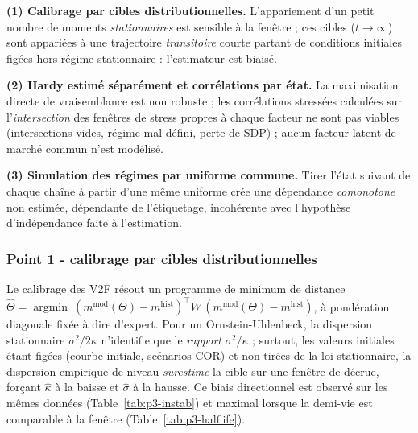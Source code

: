 \documentclass[11pt,a4paper]{article}
\begin{document}
\begin{insightbox}
\textbf{(1) Calibrage par cibles distributionnelles.} L'appariement d'un petit nombre de moments \emph{stationnaires} est sensible à la fenêtre ; ces cibles ($t\to\infty$) sont appariées à une trajectoire \emph{transitoire} courte partant de conditions initiales figées hors régime stationnaire : l'estimateur est biaisé.

\textbf{(2) Hardy estimé séparément et corrélations par état.} La maximisation directe de vraisemblance est non robuste ; les corrélations stressées calculées sur l'\emph{intersection} des fenêtres de stress propres à chaque facteur ne sont pas viables (intersections vides, régime mal défini, perte de SDP) ; aucun facteur latent de marché commun n'est modélisé.

\textbf{(3) Simulation des régimes par uniforme commune.} Tirer l'état suivant de chaque chaîne à partir d'une même uniforme crée une dépendance \emph{comonotone} non estimée, dépendante de l'étiquetage, incohérente avec l'hypothèse d'indépendance faite à l'estimation.
\end{insightbox}

\subsubsection{Point 1 - calibrage par cibles distributionnelles}

Le calibrage des V2F résout un programme de minimum de distance $\hat\Theta=\operatorname{argmin}\ (m^{\mathrm{mod}}(\Theta)-m^{\mathrm{hist}})^{\!\top} W\,(m^{\mathrm{mod}}(\Theta)-m^{\mathrm{hist}})$, à pondération diagonale fixée à dire d'expert. Pour un Ornstein-Uhlenbeck, la dispersion stationnaire $\sigma^2/2\kappa$ n'identifie que le \emph{rapport} $\sigma^2/\kappa$ ; surtout, les valeurs initiales étant figées (courbe initiale, scénarios COR) et non tirées de la loi stationnaire, la dispersion empirique de niveau \emph{surestime} la cible sur une fenêtre de décrue, forçant $\hat\kappa$ à la baisse et $\hat\sigma$ à la hausse. Ce biais directionnel est observé sur les mêmes données (Table~\ref{tab:p3-instab}) et maximal lorsque la demi-vie est comparable à la fenêtre (Table~\ref{tab:p3-halflife}).
\end{document}
